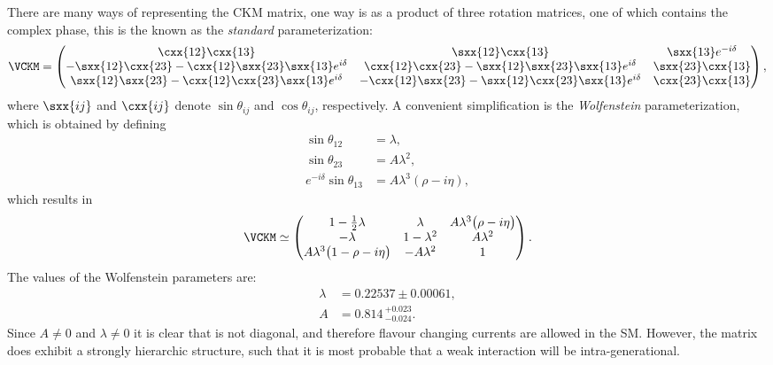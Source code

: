 There are many ways of representing the CKM matrix, one way is as a product of three rotation
matrices, one of which contains the complex phase, this is the known as the \emph{standard}
parameterization:
\begin{equation}
  \VCKM =
  \begin{pmatrix}
    \cxx{12}\cxx{13} & \sxx{12}\cxx{13} & \sxx{13}e^{-i\delta} \\
    -\sxx{12}\cxx{23}-\cxx{12}\sxx{23}\sxx{13}e^{i\delta} &
    \cxx{12}\cxx{23}-\sxx{12}\sxx{23}\sxx{13}e^{i\delta} & \sxx{23}\cxx{13} \\
    \sxx{12}\sxx{23}-\cxx{12}\cxx{23}\sxx{13}e^{i\delta} &
    -\cxx{12}\sxx{23}-\sxx{12}\cxx{23}\sxx{13}e^{i\delta} & \cxx{23}\cxx{13} \\
  \end{pmatrix},
\end{equation}
where $\sxx{ij}$ and $\cxx{ij}$ denote $\sin\theta_{ij}$ and $\cos\theta_{ij}$, respectively.
A convenient simplification is the \emph{Wolfenstein} parameterization, which is obtained by
defining
\begin{align}
  \sin\theta_{12}&=\lambda, \nonumber\\
  \sin\theta_{23}&=A\lambda^2, \nonumber\\
  e^{-i\delta}\sin\theta_{13} &= A\lambda^3(\rho-i\eta),
\end{align}
which results in
\begin{align}
  \VCKM\simeq
    \begin{pmatrix}
      1-\tfrac12\lambda & \lambda & A\lambda^3\big(\rho-i\eta\big) \\
      -\lambda & 1-\lambda^2 & A\lambda^2 \\
      A\lambda^3\big(1-\rho-i\eta\big) & -A\lambda^2 & 1 \\
    \end{pmatrix}.
  \label{eq:th:wolfenstein}
\end{align}
The values of the Wolfenstein parameters are:
\begin{align}
  \lambda &= 0.22537\pm0.00061, \nonumber\\ A&=0.814\,^{+0.023}_{-0.024}.
\end{align}
Since $A\neq0$ and $\lambda\neq0$ it is clear that \VCKM is not diagonal, and therefore flavour
changing currents are allowed in the SM.
However, the \ckm matrix does exhibit a strongly hierarchic structure, such that it is most
probable that a weak interaction will be intra-generational.


